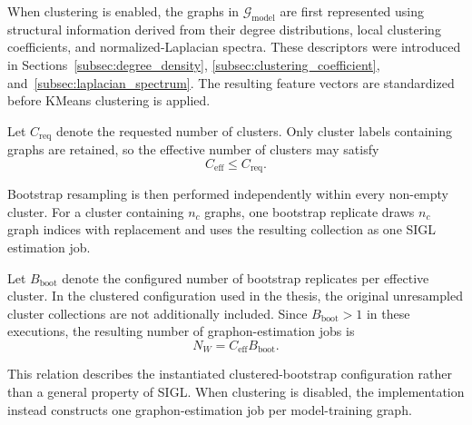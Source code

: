 When clustering is enabled, the graphs in $\mathcal{G}_{\mathrm{model}}$ are first represented using structural information derived from their degree distributions, local clustering coefficients, and normalized-Laplacian spectra. These descriptors were introduced in Sections~\ref{subsec:degree_density}, \ref{subsec:clustering_coefficient}, and~\ref{subsec:laplacian_spectrum}. The resulting feature vectors are standardized before KMeans clustering is applied.

Let \(C_{\mathrm{req}}\) denote the requested number of clusters. Only cluster labels containing graphs are retained, so the effective number of clusters may satisfy
\[
C_{\mathrm{eff}}
\leq
C_{\mathrm{req}}.
\]

Bootstrap resampling is then performed independently within every non-empty cluster. For a cluster containing \(n_c\) graphs, one bootstrap replicate draws \(n_c\) graph indices with replacement and uses the resulting collection as one SIGL estimation job.

Let \(B_{\mathrm{boot}}\) denote the configured number of bootstrap replicates per effective cluster. In the clustered configuration used in the thesis, the original unresampled cluster collections are not additionally included. Since \(B_{\mathrm{boot}}>1\) in these executions, the resulting number of graphon-estimation jobs is
\[
N_W
=
C_{\mathrm{eff}}B_{\mathrm{boot}}.
\]

This relation describes the instantiated clustered-bootstrap configuration rather than a general property of SIGL. When clustering is disabled, the implementation instead constructs one graphon-estimation job per model-training graph.


